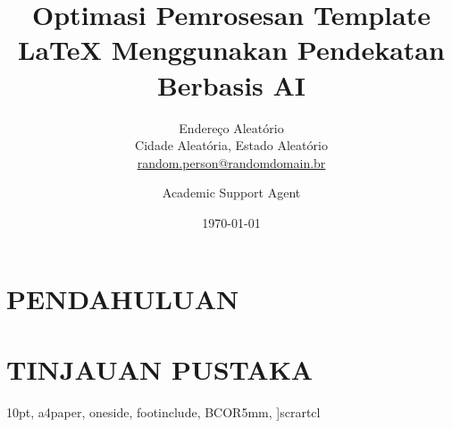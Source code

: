 \documentclass{scrartcl}
\title{Optimasi Pemrosesan Template LaTeX Menggunakan Pendekatan Berbasis AI}
\author{Academic Support Agent}
\date{\today}
\begin{document}
\maketitle

\begin{abstract}

\end{abstract}

\chapter{PENDAHULUAN}


\chapter{TINJAUAN PUSTAKA}


10pt, %
a4paper, %
oneside, %
footinclude, %
BCOR5mm, %
]{scrartcl}




\title{\normalfont\fontsize{20}{10}\selectfont {}} %

\subtitle{Endereço Aleatório\\Cidade Aleatória, Estado Aleatório\\\href{mailto:random.person@randomdomain.br}{random.person@randomdomain.br} } %

\date{} %

\usepackage[verbose]{geometry}
\geometry{top=25pt, left=70pt, right=70pt,
  textwidth=450pt,textheight=900pt,
  heightrounded}
\end{document}
